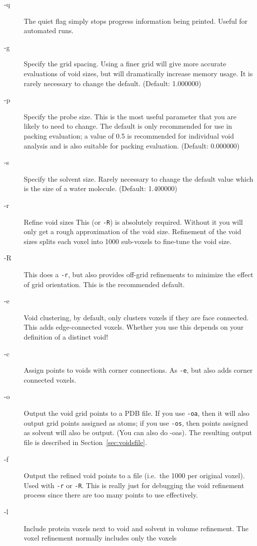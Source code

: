 \documentclass{article}
\begin{document}
\begin{description}
\item[-q] The quiet flag simply stops progress information being
  printed. Useful for automated runs.
\item[-g] Specify the grid spacing. Using a finer grid will give more
  accurate evaluations of void sizes, but will dramatically increase
  memory usage. It is rarely necessary to change the
  default. (Default: 1.000000) 
\item[-p] Specify the probe size. This is the most useful parameter
  that you are likely to need to change. The default is only
  recommended for use in packing evaluation; a value of 0.5 is
  recommended for individual void analysis and is also suitable for
  packing evaluation. (Default: 0.000000)
\item[-s] Specify the solvent size. Rarely necessary to change the
  default value which is the size of a water molecule. (Default: 1.400000)
\item[-r] Refine void sizes
  This (or \verb|-R|) is absolutely required. Without it you will only get a
  rough approximation of the void size. Refinement of the void sizes
  splits each voxel into 1000 sub-voxels to fine-tune the void size.
\item[-R] This does a \verb|-r|, but also provides off-grid refinements to
  minimize the effect of grid orientation. This is the recommended default.
\item[-e] Void clustering, by default, only clusters voxels if they
  are face connected. This adds edge-connected voxels. Whether you use
  this depends on your definition of a distinct void!
\item[-c] Assign points to voids with corner connections. As \verb|-e|, but
  also adds corner connected voxels.
\item[-o] Output the void grid points to a PDB file. If you use \verb|-oa|, then
  it will also output grid points assigned as atoms; if you use \verb|-os|,
  then points assigned as solvent will also be output. (You can also
  do -oas). The resulting output file is described in
  Section~\ref{sec:voidsfile}.
\item[-f] Output the refined void points to a file (i.e.\ the 1000 per
  original voxel). Used with \verb|-r| or \verb|-R|. This is really just for
  debugging the void refinement process since there are too many
  points to use effectively.
\item[-l] Include protein voxels next to void and solvent in volume 
  refinement. The voxel refinement normally includes only the voxels

\end{description}
\end{document}
